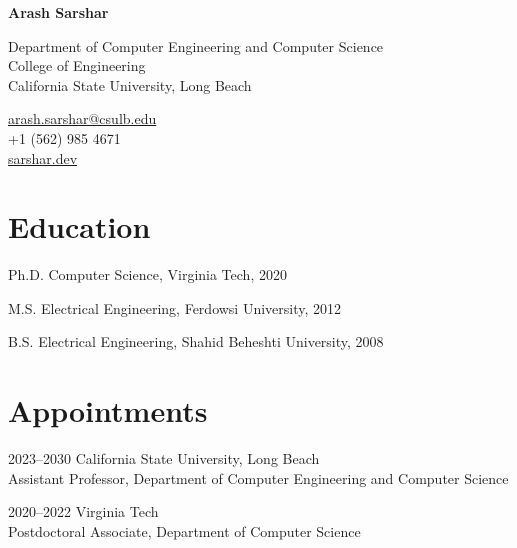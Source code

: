 \documentclass[11pt,letterpaper]{report}
\newcommand{\myname}{Arash Sarshar}
\newcommand{\namefont}[1]{{\normalfont\bfseries\Huge{#1}}}
\begin{document}
    \raggedright{}

    \namefont{\myname}

    \vspace{1em}
    \begin{minipage}[t]{0.700\textwidth}
        Department of Computer Engineering and Computer Science \\
        College of Engineering \\
        California State University, Long Beach
    \end{minipage}
    \begin{minipage}[t]{0.295\textwidth}
        \flushright{}
        \href{mailto:arash.sarshar@csulb.edu}{arash.sarshar@csulb.edu} \\
        +1 (562) 985 4671 \\
        \href{https://sarshar.dev}{sarshar.dev}
    \end{minipage}


    \section*{Education}

    \begin{tablist}

        \item[Ph.D.] \tab{}Computer Science, Virginia Tech, 2020
        \item[M.S.]  \tab{}Electrical Engineering, Ferdowsi University, 2012
        \item[B.S.]  \tab{}Electrical Engineering, Shahid Beheshti University, 2008

    \end{tablist}



    \section*{Appointments}

    \begin{tablist}

    \item[2023--\xspace{2030}]       \tab{}California State University, Long Beach \\
                              Assistant Professor, Department of Computer Engineering and Computer Science \\

    \item[2020--2022]                \tab{} Virginia Tech\\
                              Postdoctoral Associate, Department of Computer Science

    \end{tablist}
\end{document}
